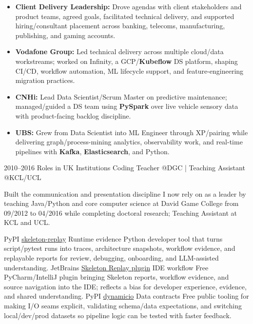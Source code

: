 \documentclass[]{../../friggeri-cv}
\begin{document}
\begin{entrylist}
{{        }
        \begin{itemize}[leftmargin=1.1em]
            \item \footnotesize\textbf{Client Delivery Leadership:} Drove agendas with client stakeholders and product teams, agreed goals, facilitated technical delivery, and supported hiring/consultant placement across banking, telecoms, manufacturing, publishing, and gaming accounts.
            \item \footnotesize\textbf{Vodafone Group:} Led technical delivery across multiple cloud/data workstreams; worked on Infinity, a GCP/\textbf{Kubeflow} DS platform, shaping CI/CD, workflow automation, ML lifecycle support, and feature-engineering migration practices.
            \item \footnotesize\textbf{CNHi:} Lead Data Scientist/Scrum Master on predictive maintenance; managed/guided a DS team using \textbf{PySpark} over live vehicle sensory data with product-facing backlog discipline.
            \item \footnotesize\textbf{UBS:} Grew from Data Scientist into ML Engineer through XP/pairing while delivering graph/process-mining analytics, observability work, and real-time pipelines with \textbf{Kafka}, \textbf{Elasticsearch}, and Python.
        \end{itemize}
    }
    \entry
    {2010--2016}
    {Roles in UK Institutions}
    {\small Coding Teacher @DGC | Teaching Assistant @KCL/UCL}
    {
        {\small
        \setlength{\parindent}{0pt}
        \setlength{\leftskip}{0pt}
        Built the communication and presentation discipline I now rely on as a leader by teaching Java/Python and core computer science at David Game College from 09/2012 to 04/2016 while completing doctoral research; Teaching Assistant at KCL and UCL.

        }
    }
\end{entrylist}
\newpage
\setlength{\parskip}{2pt}
\setlength{\parsep}{0pt}
\begin{entrylist2}
    \entrytwo
        {\small PyPI}
        {\small \href{https://pypi.org/project/skeleton-replay/}{skeleton-replay}}
        {\small Runtime evidence}
        {\footnotesize Python developer tool that turns script/pytest runs into traces, architecture snapshots, workflow evidence, and replayable reports for review, debugging, onboarding, and LLM-assisted understanding.}
    \entrytwo
        {\small JetBrains}
        {\small \href{https://plugins.jetbrains.com/plugin/32807-skeleton-replay}{Skeleton Replay plugin}}
        {\small IDE workflow}
        {\footnotesize Free PyCharm/IntelliJ plugin bringing Skeleton reports, workflow evidence, and source navigation into the IDE; reflects a bias for developer experience, evidence, and shared understanding.}
    \entrytwo
        {\small PyPI}
        {\small \href{https://pypi.org/project/dynamicio/}{dynamicio}}
        {\small Data contracts}
        {\footnotesize Free public tooling for making I/O seams explicit, validating schema/data expectations, and switching local/dev/prod datasets so pipeline logic can be tested with faster feedback.}
\end{entrylist2}
\end{document}

